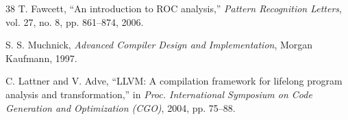 \documentclass[conference]{IEEEtran}
\begin{document}
\begin{thebibliography}{38}
T. Fawcett,
``An introduction to ROC analysis,''
\textit{Pattern Recognition Letters}, vol. 27, no. 8, pp. 861--874, 2006.

S. S. Muchnick,
\textit{Advanced Compiler Design and Implementation},
Morgan Kaufmann, 1997.

C. Lattner and V. Adve,
``LLVM: A compilation framework for lifelong program analysis and transformation,''
in \textit{Proc. International Symposium on Code Generation and Optimization (CGO)}, 2004, pp. 75--88.

\end{thebibliography}
\end{document}
